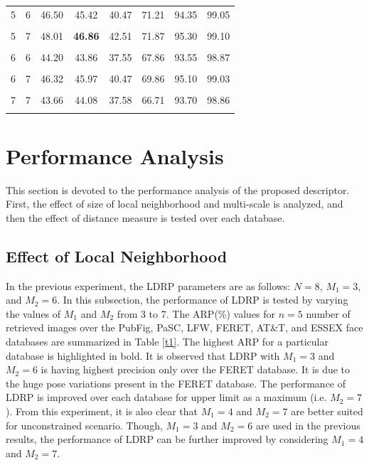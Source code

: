 \documentclass[a4paper]{article}
\begin{document}
\begin{table}[!t]
\begin{center}
\begin{tabular}{cccccccc}
5 & 6 & 46.50 & 45.42 & 40.47 & 71.21 & 94.35 & 99.05\\ \\[-0.85em]
5 & 7 & 48.01 & \textbf{46.86} & 42.51 & 71.87 & 95.30 & 99.10\\ \\[-0.85em]
6 & 6 & 44.20 & 43.86 & 37.55 & 67.86 & 93.55 & 98.87\\ \\[-0.85em]
6 & 7 & 46.32 & 45.97 & 40.47 & 69.86 & 95.10 & 99.03\\ \\[-0.85em]
7 & 7 & 43.66 & 44.08 & 37.58 & 66.71 & 93.70 & 98.86\\ \\[-0.65em]
\hline
\end{tabular}
\end{center}
\end{table}


\section{Performance Analysis}
This section is devoted to the performance analysis of the proposed descriptor. First, the effect of size of local neighborhood and multi-scale is analyzed, and then the effect of distance measure is tested over each database. 

\subsection{Effect of Local Neighborhood}
In the previous experiment, the LDRP parameters are as follows: $N=8$, $M_1=3$, and $M_2=6$. In this subsection, the performance of LDRP is tested by varying the values of $M_1$ and $M_2$ from 3 to 7. The ARP(\%) values for $n=5$ number of retrieved images over the PubFig, PaSC, LFW, FERET, AT\&T, and ESSEX face databases are summarized in Table \ref{t1}. The highest ARP for a particular database is highlighted in bold. It is observed that LDRP with $M_1=3$ and $M_2=6$ is having highest precision only over the FERET database. It is due to the huge pose variations present in the FERET database. The performance of LDRP is improved over each database for upper limit as a maximum (i.e. $M_2=7$). From this experiment, it is also clear that $M_1=4$ and $M_2=7$ are better suited for unconstrained scenario. Though, $M_1=3$ and $M_2=6$ are used in the previous results, the performance of LDRP can be further improved by considering $M_1=4$ and $M_2=7$.
\end{document}

